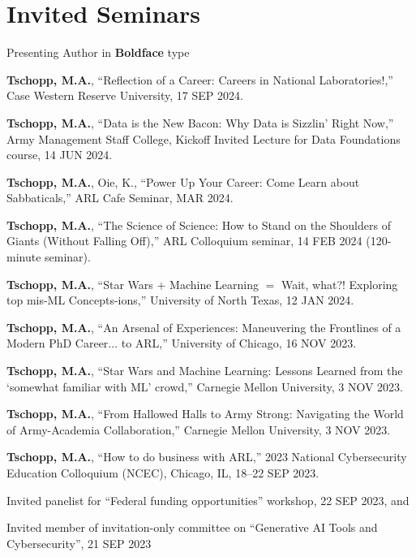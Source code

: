 \section{\sc Invited Seminars}

Presenting Author in \textbf{Boldface} type

\begin{cvlist}
\setlength{\itemsep}{0in}
\setlength{\parsep}{0in} 
\setlength{\parskip}{0in}
\setlength{\topsep}{0in} 
\setlength{\partopsep}{0in} 
\setlength{\leftmargin}{0.2in}

\item
\textbf{Tschopp, M.A.}, ``Reflection of a Career: Careers in National Laboratories!,'' Case Western Reserve University, 17 SEP 2024.

\item
\textbf{Tschopp, M.A.}, ``Data is the New Bacon: Why Data is Sizzlin' Right Now,'' Army Management Staff College, Kickoff Invited Lecture for Data Foundations course, 14 JUN 2024.

\item
\textbf{Tschopp, M.A.}, Oie, K., ``Power Up Your Career: Come Learn about Sabbaticals,'' ARL Cafe Seminar, MAR 2024.

\item
\textbf{Tschopp, M.A.}, ``The Science of Science: How to Stand on the Shoulders of Giants (Without Falling Off),'' ARL Colloquium seminar, 14 FEB 2024 (120-minute seminar).

\item
\textbf{Tschopp, M.A.}, ``Star Wars $+$ Machine Learning $=$ Wait, what?! Exploring top mis-ML Concepts-ions,'' University of North Texas, 12 JAN 2024.

\item
\textbf{Tschopp, M.A.}, ``An Arsenal of Experiences: Maneuvering the Frontlines of a Modern PhD Career... to ARL,'' University of Chicago, 16 NOV 2023.

\item
\textbf{Tschopp, M.A.}, ``Star Wars and Machine Learning: Lessons Learned from the `somewhat familiar with ML' crowd,'' Carnegie Mellon University, 3 NOV 2023.

\item
\textbf{Tschopp, M.A.}, ``From Hallowed Halls to Army Strong: Navigating the World of Army-Academia Collaboration,'' Carnegie Mellon University, 3 NOV 2023.

\item
\textbf{Tschopp, M.A.}, ``How to do business with ARL,'' 2023 National Cybersecurity Education Colloquium (NCEC), Chicago, IL, 18--22 SEP 2023.
\begin{list2}
\item[$\star$] Invited panelist for ``Federal funding opportunities'' workshop, 22 SEP 2023, and
\item[$\star$] Invited member of invitation-only committee on ``Generative AI Tools and Cybersecurity'', 21 SEP 2023
\end{list2}


\end{cvlist}
